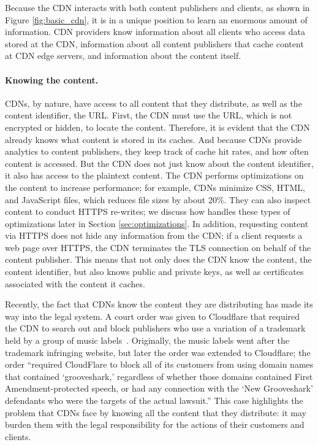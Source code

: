 Because the CDN interacts with both content publishers and clients, as shown in Figure \ref{fig:basic_cdn}, it is in a unique position 
to learn an enormous amount of information.  CDN providers know information about all clients who
access data stored at the CDN, information about all content publishers that cache content at 
CDN edge servers, and information about the content itself.

\paragraph{Knowing the content.}  CDNs, by nature, have access to all content that they distribute, as well as the 
content identifier, the URL.  First, the CDN must use the URL, which is not 
encrypted or hidden, to locate the content. Therefore, it is evident that the CDN already knows what content is 
stored in its caches.  And because CDNs provide analytics to content publishers, they keep track of cache hit 
rates, and how often content is accessed.  But the CDN does not just know about the content identifier, it also 
has access to the plaintext content.  The CDN performs optimizations on the content to increase performance; 
for example, CDNs minimize CSS, HTML, and JavaScript files, which reduces file sizes by about 20\%.  They can 
also inspect content to conduct HTTPS re-writes; we discuss how \system{} handles these types of optimizations later 
in Section \ref{sec:optimizations}. In addition, requesting content via HTTPS does not hide any information 
from the CDN; if a client requests a web page over HTTPS, the CDN terminates the TLS connection on behalf of the 
content publisher.  This means that not only does the CDN know the content, the content identifier, but also knows 
public and private keys, as well as certificates associated with the content it caches.  

Recently, the fact that CDNs 
know the content they are distributing has made its way into the legal system.  A court order was given to Cloudflare 
that required the CDN to search out and block publishers who use a variation of a trademark held by a group of 
music labels~\cite{eff_cloudflare_trademark}.  Originally, the music labels went after the trademark infringing 
website, but later the order was extended to Cloudflare; the order ``required CloudFlare to block all of its customers 
from using domain names that contained `grooveshark,' regardless of whether those domains contained First 
Amendment-protected speech, or had any connection with the `New Grooveshark' defendants who were the 
targets of the actual lawsuit.''  This case highlights the problem that CDNs face by knowing all the content 
that they distribute: it may burden them with the legal responsibility for the actions of their customers 
and clients.

